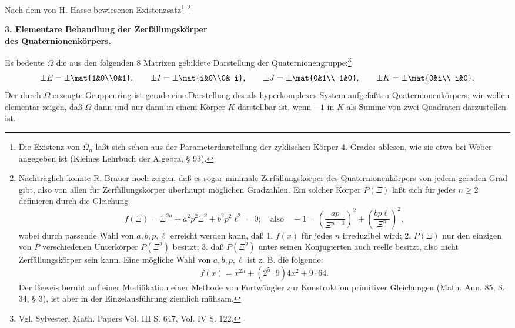 Nach dem von H. Hasse bewiesenen Existenzsatz\footnote{Die Existenz von $\Omega_n$ läßt sich schon aus der Parameterdarstellung der zyklischen Körper 4. Grades ablesen, wie sie etwa bei Weber angegeben ist (Kleines Lehrbuch der Algebra, § 93).} \footnote{Nachträglich konnte R. Brauer noch zeigen, daß es sogar minimale Zerfällungskörper des Quaternionenkörpers von jedem geraden Grad gibt, also von allen für Zerfällungskörper überhaupt möglichen Gradzahlen. Ein solcher Körper $P(\Xi)$ läßt sich für jedes $n\ge2$ definieren durch die Gleichung
\[
 f(\Xi)=\Xi^{2n}+a^2p^2\Xi^2+b^2p^2\ell^2=0;
\quad \text{also}\quad -1=\left(\frac{ap}{\Xi^{n-1}}\right)^2+
        \left(\frac{bp\ell}{\Xi^n}\right)^2,
\]
wobei durch passende Wahl von $a,b,p,\ell$ erreicht werden kann, daß 1. $f(x)$ für jedes $n$ irreduzibel wird; 2. $P(\Xi)$ nur den einzigen von $P$ verschiedenen Unterkörper $P(\Xi^2)$ besitzt; 3. daß $P(\Xi^2)$ unter seinen Konjugierten auch reelle besitzt, also nicht Zerfällungskörper sein kann. Eine mögliche Wahl von $a,b,p,\ell$ ist z. B. die folgende:
\[
        f(x)=x^{2n}+(2^5\cdot9)4x^2+9\cdot64.
\]
Der Beweis beruht auf einer Modifikation einer Methode von Furtwängler zur Konstruktion primitiver Gleichungen (Math. Ann. 85, S. 34, § 3), ist aber in der Einzelausführung ziemlich mühsam.}

\begin{center}
\textbf{3. Elementare Behandlung der Zerfällungskörper\\
des Quaternionenkörpers.}
\end{center}

Es bedeute $\Omega$ die aus den folgenden 8 Matrizen gebildete Darstellung der Quaternionengruppe:\footnote{Vgl. Sylvester, Math. Papers Vol. III S. 647, Vol. IV S. 122.}
\[
\pm E=\pm\mat{1&0\\0&1},\qquad
\pm I=\pm\mat{i&0\\0&-i},\qquad
\pm J=\pm\mat{0&1\\-1&0},\qquad
\pm K=\pm\mat{0&i\\ i&0}.
\]
Der durch $\Omega$ erzeugte Gruppenring ist gerade eine Darstellung des als hyperkomplexes System aufgefaßten Quaternionenkörpers; wir wollen elementar zeigen, daß $\Omega$ dann und nur dann in einem Körper $K$ darstellbar ist, wenn $-1$ in $K$ als Summe von zwei Quadraten darzustellen ist.

